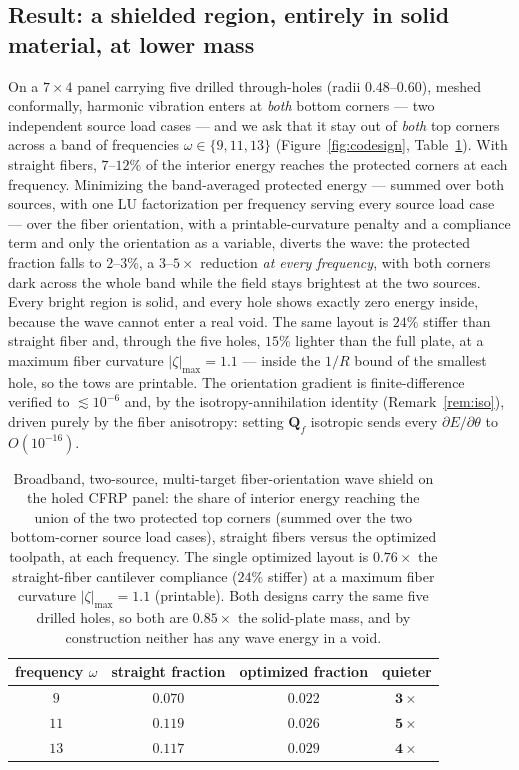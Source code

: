 \documentclass[11pt]{article}
\begin{document}
\subsection{Result: a shielded region, entirely in solid material, at lower mass}
\label{sec:codesign:result}
On a $7\times4$ panel carrying five drilled through-holes (radii $0.48$--$0.60$),
meshed conformally, harmonic vibration enters at \emph{both} bottom corners --- two
independent source load cases --- and we ask that it stay out of \emph{both} top
corners across a band of frequencies $\omega\in\{9,11,13\}$
(Figure~\ref{fig:codesign}, Table~\ref{tab:codesign}). With straight fibers,
$7$--$12\%$ of the interior energy reaches the protected corners at each frequency.
Minimizing the band-averaged protected energy --- summed over both sources, with one
LU factorization per frequency serving every source load case --- over the fiber
orientation, with a printable-curvature penalty and a compliance term and only the
orientation as a variable, diverts the wave: the protected fraction falls to
$2$--$3\%$, a $3$--$5\times$ reduction \emph{at every frequency}, with both corners
dark across the whole band while the field stays brightest at the two sources. Every
bright region is solid, and every hole shows exactly zero energy inside, because the
wave cannot enter a real void. The same layout is $24\%$ stiffer than straight fiber
and, through the five holes, $15\%$ lighter than the full plate, at a maximum fiber
curvature $|\zeta|_{\max}=1.1$ --- inside the $1/R$ bound of the smallest hole, so the
tows are printable. The orientation gradient is finite-difference verified to
$\lesssim10^{-6}$ and, by the isotropy-annihilation identity (Remark~\ref{rem:iso}),
driven purely by the fiber anisotropy: setting $\mathbf Q_f$ isotropic sends every
$\partial E/\partial\theta$ to $O(10^{-16})$.

\begin{table}[!htbp]
\centering\small
\caption{Broadband, two-source, multi-target fiber-orientation wave shield on the
holed CFRP panel: the share of interior energy reaching the union of the two protected
top corners (summed over the two bottom-corner source load cases), straight fibers
versus the optimized toolpath, at each frequency. The single optimized layout is
$0.76\times$ the straight-fiber cantilever compliance ($24\%$ stiffer) at a maximum
fiber curvature $|\zeta|_{\max}=1.1$ (printable). Both designs carry the same five
drilled holes, so both are $0.85\times$ the solid-plate mass, and by construction
neither has any wave energy in a void.}
\label{tab:codesign}
\begin{tabular}{cccc}
\toprule
frequency $\omega$ & straight fraction & optimized fraction & quieter\\
\midrule
$9$  & $0.070$ & $\mathbf{0.022}$ & $\mathbf{3\times}$\\
$11$ & $0.119$ & $\mathbf{0.026}$ & $\mathbf{5\times}$\\
$13$ & $0.117$ & $\mathbf{0.029}$ & $\mathbf{4\times}$\\
\bottomrule
\end{tabular}
\end{table}
\end{document}
